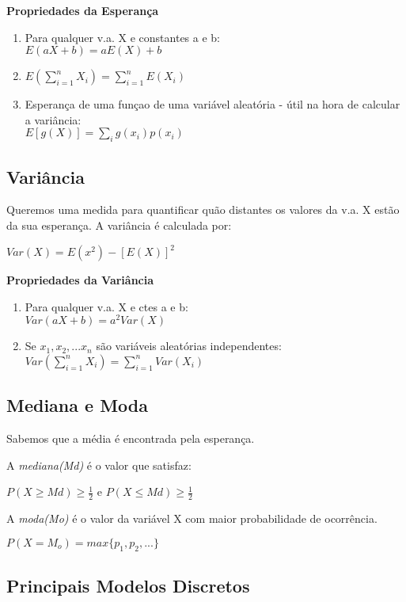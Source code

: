 \documentclass[a4paper, 12pt]{article}
\begin{document}
	\textbf{Propriedades da Esperança}
	\begin{enumerate}
		\item Para qualquer v.a. X e constantes a e b: \\ $E(aX + b) = aE(X) + b$
		\item $E(\sum_{i=1}^{n} X_{i}) = \sum_{i=1}^{n}E(X_{i})$
		\item Esperança de uma funçao de uma variável aleatória - útil na hora de calcular a variância:\\
		$E[g(X)] = \sum_{i}g(x_{i})p(x_{i})$
	\end{enumerate}
\subsection{Variância}
	Queremos uma medida para quantificar quão distantes os valores da v.a. X estão da sua esperança. A variância é calculada por:
	\begin{center}
		\LARGE
		$Var(X) = E(x^{2}) - [E(X)]^{2}$
	\end{center}
	
	\textbf{Propriedades da Variância}
	\begin{enumerate}
		\item Para qualquer v.a. X e ctes a e b:\\$Var(aX + b) = a^{2}Var(X)$
		\item Se $x_{1}, x_{2}, ... x_{n}$ são variáveis aleatórias independentes:\\
		$Var(\sum_{i=1}^{n}X_{i}) = \sum_{i=1}^{n}Var(X_{i})$
	\end{enumerate}

\subsection{Mediana e Moda}
	Sabemos que a média é encontrada pela esperança.
	
	A \textit{mediana(Md)} é o valor que satisfaz:
	\begin{center}
		\LARGE
		$P(X\geq Md) \geq \frac{1}{2}$ e $P(X\leq Md) \geq \frac{1}{2}$
	\end{center}

	A \textit{moda(Mo)} é o valor da variável X com maior probabilidade de ocorrência.
	\begin{center}
		\LARGE
		$P(X = M_{o}) = max\{p_{1}, p_{2}, ...\}$
	\end{center}

\subsection{Principais Modelos Discretos}
\end{document}
